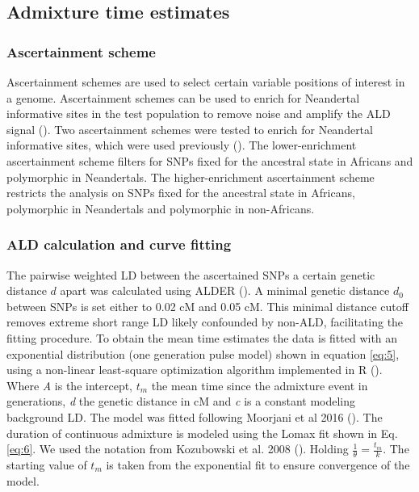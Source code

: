 \documentclass[]{article}
\begin{document}
\subsection{Admixture time estimates}\label{admixture time estimates}

\subsubsection{Ascertainment scheme}\label{asceteinment scheme}

Ascertainment schemes are used to select certain variable positions of
interest in a genome. Ascertainment schemes can be used to enrich for
Neandertal informative sites in the test population to remove noise and
amplify the ALD signal (\cite{sankararaman_date_2012}). Two
ascertainment schemes were tested to enrich for Neandertal informative
sites, which were used previously
(\cite{sankararaman_date_2012,fu_genome_2014}). The lower-enrichment
ascertainment scheme filters for SNPs fixed for the ancestral state in
Africans and polymorphic in Neandertals. The higher-enrichment
ascertainment scheme restricts the analysis on SNPs fixed for the
ancestral state in Africans, polymorphic in Neandertals and polymorphic
in non-Africans.

\subsubsection{ALD calculation and curve fitting}\label{ALD calculation and curve fitting}

The pairwise weighted LD between the ascertained SNPs a certain genetic
distance \(d\) apart was calculated using ALDER
(\cite{loh_inferring_2013}). A minimal genetic distance \(d_0\) between
SNPs is set either to 0.02 cM and 0.05 cM. This minimal distance cutoff
removes extreme short range LD likely confounded by non-ALD,
facilitating the fitting procedure. To obtain the mean time estimates
the data is fitted with an exponential distribution (one generation pulse model) shown in equation
\ref{eq:5}, using a non-linear least-square optimization algorithm
implemented in R (\cite{R_Core_Team_2019}). Where \emph{A} is the
intercept, $t_m$ the mean time since the admixture event in generations,
\emph{d} the genetic distance in cM and \emph{c} is a constant modeling
background LD. The model was fitted following Moorjani et al 2016
(\cite{moorjani_genetic_2016}). The duration of continuous admixture is
modeled using the Lomax fit shown in Eq. \ref{eq:6}. We used the
notation from Kozubowski et al. 2008 (\cite{Kozubowski_Testing_2008}). Holding $\frac{1}{\theta} = \frac{t_m}{k}$.
The starting value of $t_m$  is taken from the exponential fit to ensure
convergence of the model.
\end{document}
